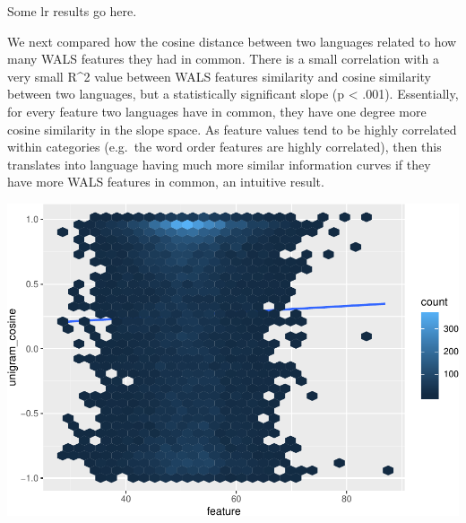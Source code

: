 \documentclass[11pt,]{article}
\newenvironment{Shaded}{\begin{snugshade}}{\end{snugshade}}
\newcommand{\DataTypeTok}[1]{\textcolor[rgb]{0.13,0.29,0.53}{#1}}
\newcommand{\FloatTok}[1]{\textcolor[rgb]{0.00,0.00,0.81}{#1}}
\newcommand{\KeywordTok}[1]{\textcolor[rgb]{0.13,0.29,0.53}{\textbf{#1}}}
\newcommand{\NormalTok}[1]{#1}
\newcommand{\OperatorTok}[1]{\textcolor[rgb]{0.81,0.36,0.00}{\textbf{#1}}}
\newcommand{\StringTok}[1]{\textcolor[rgb]{0.31,0.60,0.02}{#1}}
\begin{document}
Some lr results go here.

We next compared how the cosine distance between two languages related to how many WALS features they had in common. There is a small correlation with a very small R\^{}2 value between WALS features similarity and cosine similarity between two languages, but a statistically significant slope (p \textless{} .001). Essentially, for every feature two languages have in common, they have one degree more cosine similarity in the slope space. As feature values tend to be highly correlated within categories (e.g.~the word order features are highly correlated), then this translates into language having much more similar information curves if they have more WALS features in common, an intuitive result.

\begin{Shaded}
\end{Shaded}

\includegraphics{paper_files/figure-latex/wals features vs cosine similarity-1.pdf}
\end{document}
